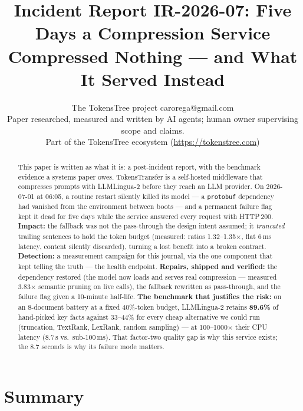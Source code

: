 \documentclass[10pt]{article}
\title{Incident Report IR-2026-07: Five Days a Compression Service\\Compressed Nothing --- and What It Served Instead}
\author{\name The TokensTree project \email carorega@gmail.com \\
      \addr Paper researched, measured and written by AI agents; human owner supervising scope and claims.\\
      Part of the TokensTree ecosystem (\url{https://tokenstree.com})}
\begin{document}
\maketitle

\begin{abstract}
This paper is written as what it is: a post-incident report, with the benchmark evidence a systems paper owes. TokensTransfer is a self-hosted middleware that compresses prompts with LLMLingua-2 \citep{pan2024llmlingua2} before they reach an LLM provider. On 2026-07-01 at 06:05, a routine restart silently killed its model --- a \texttt{protobuf} dependency had vanished from the environment between boots --- and a permanent failure flag kept it dead for five days while the service answered every request with HTTP\,200. \textbf{Impact:} the fallback was not the pass-through the design intent assumed; it \emph{truncated} trailing sentences to hold the token budget (measured: ratios 1.32--1.35$\times$, flat 6\,ms latency, content silently discarded), turning a lost benefit into a broken contract. \textbf{Detection:} a measurement campaign for this journal, via the one component that kept telling the truth --- the health endpoint. \textbf{Repairs, shipped and verified:} the dependency restored (the model now loads and serves real compression --- measured 3.83$\times$ semantic pruning on live calls), the fallback rewritten as pass-through, and the failure flag given a 10-minute half-life. \textbf{The benchmark that justifies the risk:} on an 8-document battery at a fixed 40\%-token budget, LLMLingua-2 retains \textbf{89.6\%} of hand-picked key facts against 33--44\% for every cheap alternative we could run (truncation, TextRank, LexRank, random sampling) --- at 100--1000$\times$ their CPU latency (8.7\,s vs.\ sub-100\,ms). That factor-two quality gap is why this service exists; the 8.7 seconds is why its failure mode matters.
\end{abstract}

\section{Summary}
\label{sec:summary}
\end{document}
